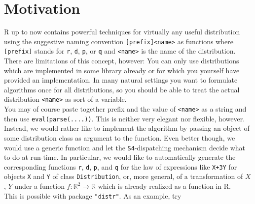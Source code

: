 \documentclass[11pt]{article}
\newcommand{\code}[1]{{\tt #1}}
\newcommand{\pkg}[1]{{\tt "#1"}}
\newcommand{\Reals}{\mathbb{R}}
\begin{document}
\section{Motivation}
{\sf R} up to now contains powerful techniques for virtually
any useful distribution using the suggestive naming convention
{\tt [prefix]<name>} as functions where {\tt [prefix]} stands for
 {\tt r}, {\tt d}, {\tt p}, or {\tt q}
 and {\tt <name>} is the name of the distribution.\\
There are limitations of this concept, however:
You can only use distributions which are implemented in some library
already or for which you yourself have provided an implementation.
In many natural settings you want to formulate algorithms once for
all distributions, so you should be able to treat the actual distribution {\tt <name>}
as sort of a variable.\\
You may of course paste together prefix and the value of {\tt <name>} as a string and
then use \code{eval(parse(....))}. This is neither very elegant nor flexible, however.\\
%
Instead, we would rather like to implement the algorithm by passing an object of some distribution class
as argument to the function. Even better though, we would use a generic function
and let the {\tt S4}-dispatching mechanism decide what to do at run-time.
In particular, we would like to automatically generate the corresponding functions
{\tt r}, {\tt d}, {\tt p}, and {\tt q} for the law of expressions like
\code{X+3Y} for objects \code{X} and \code{Y} of class \code{Distribution}, or, more general, of a
transformation of $X$, $Y$ under a function $f\colon \Reals^2 \to \Reals$
which is already realized as a function in {\sf R}.\\
This is possible with package \pkg{distr}. As an example, try
\end{document}
